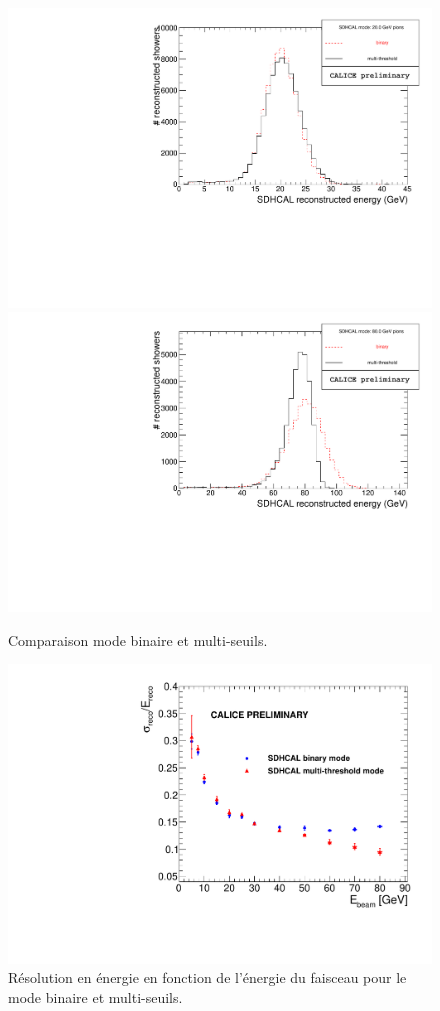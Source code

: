 \begin{figure}[!h]
  \begin{center}
    \includegraphics[width=.45\textwidth]{SDHCAL/figs/Pi20GeV_SDHCAL_2modes_overlay.pdf}
    \includegraphics[width=.45\textwidth]{SDHCAL/figs/Pi80GeV_SDHCAL_2modes_overlay.pdf}
    \caption{Comparaison mode binaire et multi-seuils.}
    \label{fig:multi_vs_binary}
  \end{center}
\end{figure}

\begin{figure}[!h]
  \begin{center}
    \includegraphics[width=.55\textwidth]{SDHCAL/figs/RESOLUTION.pdf}
    \caption{Résolution en énergie en fonction de l’énergie du faisceau pour le mode binaire et multi-seuils.}
    \label{fig:multi_vs_binary}
  \end{center}
\end{figure}
